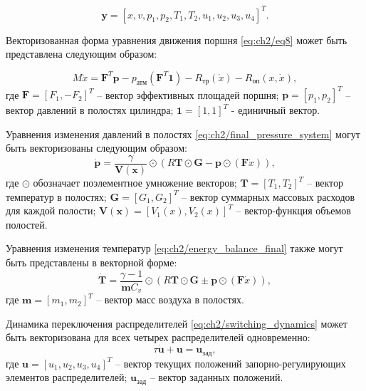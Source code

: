 \begin{equation}\label{eq:ch2/state_vector}
    \mathbf{y} = [x, v, p_1, p_2, T_1, T_2, u_1, u_2, u_3, u_4]^T.
\end{equation}

Векторизованная форма уравнения движения поршня \eqref{eq:ch2/eq8} может быть представлена следующим образом:

\begin{equation}\label{eq:ch2/vec_motion}
    M\ddot{x} = \mathbf{F}^T\mathbf{p} - p_\text{атм}(\mathbf{F}^T\mathbf{1}) - R_\text{тр}(\dot{x}) - R_\text{оп}(x, \dot{x}),
\end{equation}
где $\mathbf{F} = [F_1, -F_2]^T$ -- вектор эффективных площадей поршня;
$\mathbf{p} = [p_1, p_2]^T$ -- вектор давлений в полостях цилиндра;
$\mathbf{1} = [1, 1]^T$ - единичный вектор.

Уравнения изменения давлений в полостях \eqref{eq:ch2/final_pressure_system} могут быть векторизованы следующим образом:
\begin{equation}\label{eq:ch2/vec_pressure}
    \dot{\mathbf{p}} = \frac{\gamma}{\mathbf{V}(\mathbf{x})} \odot (R\mathbf{T} \odot \mathbf{G} - \mathbf{p} \odot (\mathbf{F}\dot{x})),
\end{equation}
где $\odot$ обозначает поэлементное умножение векторов;
$\mathbf{T} = [T_1, T_2]^T$ -- вектор температур в полостях;
$\mathbf{G} = [G_1, G_2]^T$ -- вектор суммарных массовых расходов для каждой полости;
$\mathbf{V}(\mathbf{x}) = [V_1(x), V_2(x)]^T$ -- вектор-функция объемов полостей.

Уравнения изменения температур \eqref{eq:ch2/energy_balance_final} также могут быть представлены в векторной форме:
\begin{equation}\label{eq:ch2/vec_temperature}
    \dot{\mathbf{T}} = \frac{\gamma-1}{\mathbf{m}C_v} \odot (R\mathbf{T} \odot \mathbf{G} \pm \mathbf{p} \odot (\mathbf{F}\dot{x})),
\end{equation}
где $\mathbf{m} = [m_1, m_2]^T$ -- вектор масс воздуха в полостях.

Динамика переключения распределителей \eqref{eq:ch2/switching_dynamics} может быть векторизована для всех четырех распределителей одновременно:
\begin{equation}\label{eq:ch2/vec_switching}
    \tau \dot{\mathbf{u}} + \mathbf{u} = \mathbf{u}_\text{зад},
\end{equation}
где $\mathbf{u} = [u_1, u_2, u_3, u_4]^T$ -- вектор текущих положений запорно-регулирующих элементов распределителей;
$\mathbf{u}_\text{зад}$ -- вектор заданных положений.

